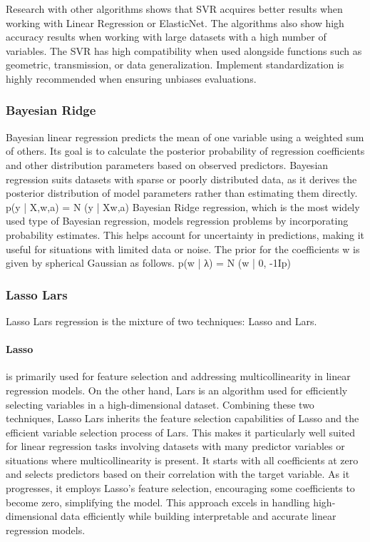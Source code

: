 Research with other algorithms shows that SVR acquires better results when working with Linear Regression or ElasticNet. The algorithms also show high accuracy results when working with large datasets with a high number of variables. The SVR has high compatibility when used alongside functions such as geometric, transmission, or data generalization.  Implement standardization is highly recommended when ensuring unbiases evaluations.

\subsubsection{Bayesian Ridge}
Bayesian linear regression predicts the mean of one variable using a weighted sum of others. Its goal is to calculate the posterior probability of regression coefficients and other distribution parameters based on observed predictors.  Bayesian regression suits datasets with sparse or poorly distributed data, as it derives the posterior distribution of model parameters rather than estimating them directly. 
p(y | X,w,a) = N (y | Xw,a)
Bayesian Ridge regression, which is the most widely used type of Bayesian regression, models regression problems by incorporating probability estimates. This helps account for uncertainty in predictions, making it useful for situations with limited data or noise. The prior for the coefficients w is given by spherical Gaussian as follows.
p(w | λ) = N (w | 0, -1Ip)

\subsubsection{Lasso Lars}
Lasso Lars regression is the mixture of two techniques: Lasso and Lars. 
\paragraph{Lasso} is primarily used for feature selection and addressing multicollinearity in linear regression models. On the other hand, Lars is an algorithm used for efficiently selecting variables in a high-dimensional dataset. Combining these two techniques, Lasso Lars inherits the feature selection capabilities of Lasso and the efficient variable selection process of Lars. This makes it particularly well suited for linear regression tasks involving datasets with many predictor variables or situations where multicollinearity is present. 
It starts with all coefficients at zero and selects predictors based on their correlation with the target variable. As it progresses, it employs Lasso’s feature selection, encouraging some coefficients to become zero, simplifying the model. This approach excels in handling high-dimensional data efficiently while building interpretable and accurate linear regression models.

